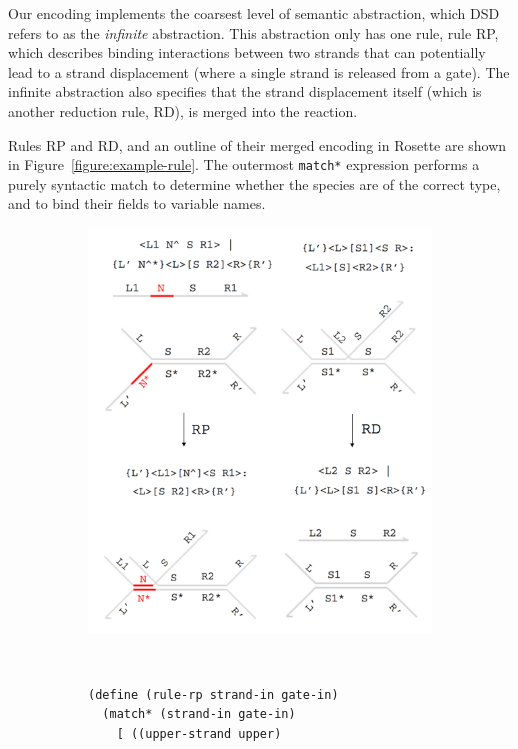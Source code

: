 \documentclass{article}
\begin{document}
Our encoding implements the coarsest level of semantic abstraction, which DSD
refers to as the \emph{infinite} abstraction. This abstraction only has one
rule, rule RP, which describes binding interactions between two strands that can
potentially lead to a strand displacement (where a single strand is released
from a gate). The infinite abstraction also specifies that the strand
displacement itself (which is another reduction rule, RD), is merged
into the reaction.

Rules RP and RD, and an outline of their merged encoding in Rosette are shown in
Figure~\ref{figure:example-rule}. The outermost \verb;match*; expression
performs a purely syntactic match to determine whether the species are
of the correct type, and to bind their fields to variable names.

\begin{figure}

\begin{subfigure}[c]{0.5\textwidth}
\includegraphics[width=\textwidth]{figures/rule-merge.png}
\end{subfigure}
~
\begin{subfigure}[c]{0.5\textwidth}
\begin{lstlisting}[basicstyle=\footnotesize\ttfamily]
(define (rule-rp strand-in gate-in)
  (match* (strand-in gate-in)
    [ ((upper-strand upper)


\end{lstlisting}
\end{subfigure}
\end{figure}
\end{document}
